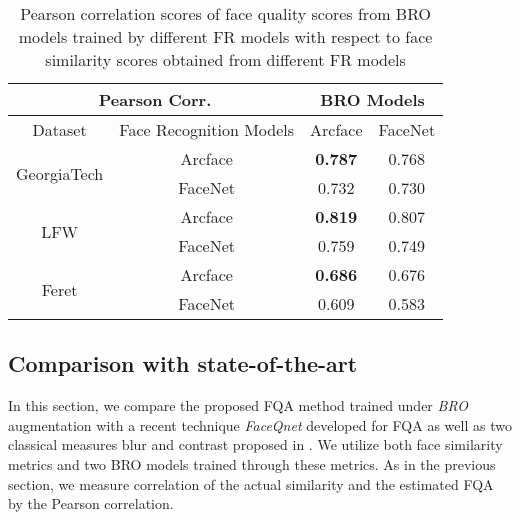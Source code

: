 \documentclass[runningheads]{llncs}
\begin{document}
\begin{table}[h!]
  \begin{center}
    \caption{Pearson correlation scores of face quality scores from BRO models trained by different FR models with respect to face similarity scores obtained from different FR models}
    \begin{tabular}{c c | c c}
            \toprule
            \midrule
                \multicolumn{2}{c}{Pearson Corr.} & \multicolumn{2}{c}{BRO Models}\\
                \hline
                {Dataset} & Face Recognition Models & {Arcface} & {FaceNet} \\ 
                \hline
                \multirow{2}{*}{GeorgiaTech} & Arcface &  \textbf{0.787} & 0.768 \\
               & FaceNet & 0.732 & 0.730 \\
                \hline
               \multirow{2}{*}{LFW} & Arcface & \textbf{0.819} & 0.807 \\
               & FaceNet & 0.759 & 0.749 \\
                \hline
                \multirow{2}{*}{Feret} & Arcface & \textbf{0.686} & 0.676 \\
               & FaceNet & 0.609 & 0.583 \\
            \midrule
            \bottomrule
    \end{tabular}
    \label{tab:SimilarityCrossCheck}
  \end{center}
\end{table}

\subsection{Comparison with state-of-the-art}
In this section, we compare the proposed FQA method trained under \textit{BRO} augmentation with a recent technique \textit{FaceQnet} \cite{HernandezOrtega2019} developed for FQA as well as two classical measures blur and contrast proposed in \cite{Lienhard-2015}. We utilize both face similarity metrics and two BRO models trained through these metrics. As in the previous section, we measure correlation of the actual similarity and the estimated FQA by the Pearson correlation.   
\end{document}
